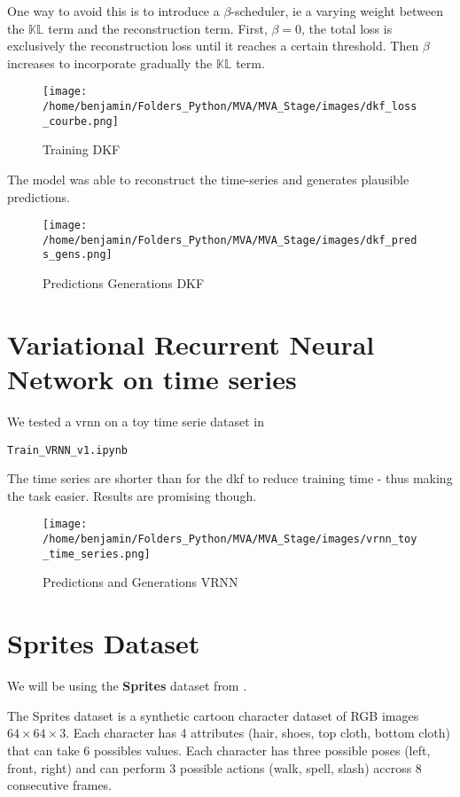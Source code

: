 One way to avoid this is to introduce a $\beta$-scheduler, ie a varying weight between the $\mathbb{KL}$ term and the reconstruction term. First, $\beta=0$, 
the total loss is exclusively the reconstruction loss until it reaches a certain threshold. Then $\beta$ increases to incorporate gradually the $\mathbb{KL}$ term.

\begin{figure}[H]
    \centering
    \texttt{[image: /home/benjamin/Folders\_Python/MVA/MVA\_Stage/images/dkf\_loss\_courbe.png]}
    \caption{Training DKF}
    \label{fig:Training DKF}
\end{figure}

The model was able to reconstruct the time-series and generates plausible predictions.

\begin{figure}[H]
    \centering
    \texttt{[image: /home/benjamin/Folders\_Python/MVA/MVA\_Stage/images/dkf\_preds\_gens.png]}
    \caption{Predictions Generations DKF}
    \label{fig:Predictions Generations DKF}
\end{figure}

\section{Variational Recurrent Neural Network on time series}

We tested a \gls{vrnn} on a toy time serie dataset in
\begin{verbatim}
Train_VRNN_v1.ipynb
\end{verbatim}
The time series are shorter than for the \gls{dkf} to reduce training time - thus making the task easier. Results are promising though.

\begin{figure}[H]
    \centering
    \texttt{[image: /home/benjamin/Folders\_Python/MVA/MVA\_Stage/images/vrnn\_toy\_time\_series.png]}
    \caption{Predictions and Generations VRNN}
    \label{fig:Predictions Generations VRNN}
\end{figure}


\section{Sprites Dataset}

We will be using the \textbf{Sprites} dataset from \cite{li_disentangled_2018}.

The Sprites dataset is a synthetic cartoon character dataset of RGB images $64 \times 64 \times 3$. Each character has 4 attributes 
(hair, shoes, top cloth, bottom cloth) that can take 6 possibles values. Each character has three possible poses (left, front, right) 
and can perform 3 possible actions (walk, spell, slash) accross 8 consecutive frames.

